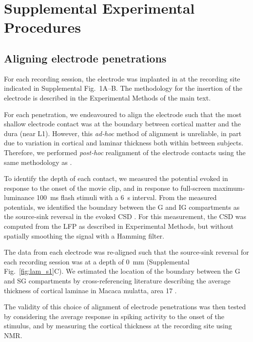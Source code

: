 \FloatBarrier

\section{Supplemental Experimental Procedures}

\subsection{Aligning electrode penetrations}

For each recording session, the electrode was implanted in  at the recording site indicated in Supplemental Fig.~1A--B.
The methodology for the insertion of the electrode is described in the Experimental Methods of the main text.

For each penetration, we endeavoured to align the electrode such that the most shallow electrode contact was at the boundary between cortical matter and the dura (near \ac{L1}).
However, this \textit{ad-hoc} method of alignment is unreliable, in part due to variation in cortical and laminar thickness both within between subjects.
Therefore, we performed \textit{post-hoc} realignment of the electrode contacts using the same methodology as \citet{Self2013,VanKerkoerle2014}.

To identify the depth of each contact, we measured the potential evoked in response to the onset of the movie clip, and in response to full-screen maximum-luminance \SI{100}{\milli\second} flash stimuli with a \SI{6}{\second} interval.
From the measured potentials, we identified the boundary between the \ac{G} and \ac{IG} compartments as the source-sink reversal in the evoked \ac{CSD} \citep{Mitzdorf1979,Mitzdorf1985}.
For this measurement, the \ac{CSD} was computed from the \ac{LFP} as described in Experimental Methods, but without spatially smoothing the signal with a Hamming filter.

The data from each electrode was re-aligned such that the source-sink reversal for each recording session was at a depth of \SI{0}{\milli\metre} (Supplemental Fig.~\ref{fig:lam_s1}C).
We estimated the location of the boundary between the \ac{G} and \ac{SG} compartments by cross-referencing literature describing the average thickness of cortical laminae in Macaca mulatta, area 17 \citep{Lund1973,OKusky1982}.

The validity of this choice of alignment of electrode penetrations was then tested by considering the average response in spiking activity to the onset of the stimulus, and by measuring the cortical thickness at the recording site using \ac{NMR}.

